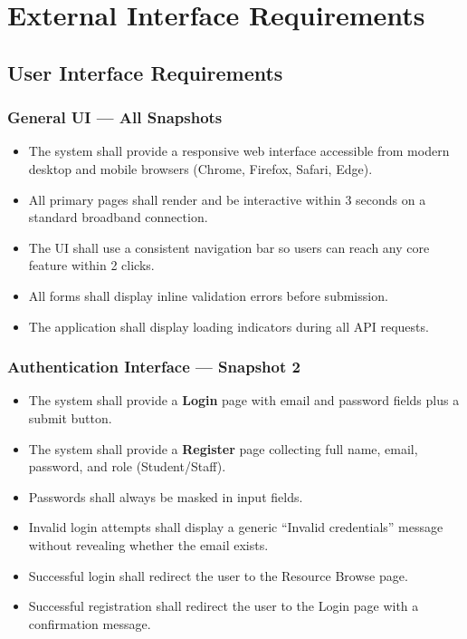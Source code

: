 \documentclass[12pt]{article}
\begin{document}
\section{External Interface Requirements}

\subsection{User Interface Requirements}

\subsubsection{General UI --- All Snapshots}
\begin{itemize}
    \item The system shall provide a responsive web interface accessible from modern desktop and mobile browsers (Chrome, Firefox, Safari, Edge).
    \item All primary pages shall render and be interactive within 3 seconds on a standard broadband connection.
    \item The UI shall use a consistent navigation bar so users can reach any core feature within 2 clicks.
    \item All forms shall display inline validation errors before submission.
    \item The application shall display loading indicators during all API requests.
\end{itemize}

\subsubsection{Authentication Interface --- Snapshot 2}
\begin{itemize}
    \item The system shall provide a \textbf{Login} page with email and password fields plus a submit button.
    \item The system shall provide a \textbf{Register} page collecting full name, email, password, and role (Student/Staff).
    \item Passwords shall always be masked in input fields.
    \item Invalid login attempts shall display a generic ``Invalid credentials'' message without revealing whether the email exists.
    \item Successful login shall redirect the user to the Resource Browse page.
    \item Successful registration shall redirect the user to the Login page with a confirmation message.
\end{itemize}
\end{document}
